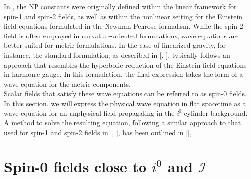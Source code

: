 In \cite{NewPen68}, the NP constants were originally defined within the linear framework for spin-1 and spin-2 fields, as well as within the nonlinear setting for the Einstein field equations formulated in the Newman-Penrose formalism.
While the spin-2 field is often employed in curvature-oriented formulations, wave equations are better suited for metric formulations. In the case of linearized gravity, for instance, the standard formulation, as described in [\cite{Mag07a}, \cite{Wal84a}], typically follows an approach that resembles the hyperbolic reduction of the Einstein field equations in harmonic gauge. In this formulation, the final expression takes the form of a wave equation for the metric components. \\

Scalar fields that satisfy these wave equations can be referred to as spin-0 fields. In this section, we will express the physical wave equation in flat spacetime as a wave equation for an unphysical field propagating in the $i^0$ cylinder background. A method to solve the resulting equation, following a similar approach to that used for spin-1 and spin-2 fields in [\cite{Val07}, \cite{GasKro16d}], has been outlined in [\cite{MinMacKro22}], \cite{GasPin23}.
\section{Spin-0 fields close to $i^0$ and $\mathscr{I}$}
\label{sec:Spin0FieldsCloseToI0AndI}

